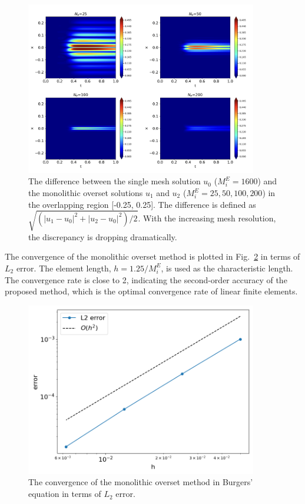 \documentclass[preprint,12pt,sort&compress]{elsarticle}
\theoremstyle{definition}%
\begin{document}
\begin{figure}[!htbp]
	\centering
	\includegraphics[angle=0,width=0.9\textwidth]{fig/burgers-diff.png}
	\caption{The difference between the single mesh solution $u_0$ ($M_i^E=1600$) and the monolithic overset solutions $u_1$ and $u_2$ ($M_i^E=25,50,100,200$) in the overlapping region [-0.25, 0.25]. The difference is defined as $\sqrt{ (|u_1-u_0|^2+|u_2-u_0|^2)/2}$. With the increasing mesh resolution, the discrepancy is dropping dramatically.}
	\label{fig:burgers-diff}
\end{figure}
The convergence of the monolithic overset method is plotted in Fig.~\ref{fig:burgers-convergence} in terms of $L_2$ error. The element length, $h=1.25/M_i^E$,
is used as the characteristic length. The convergence rate is close to 2, indicating the second-order accuracy of the proposed method, which is the optimal convergence rate of linear finite elements.\\
\begin{figure}[!htbp]
  \centering
	\includegraphics[angle=0,width=0.9\textwidth]{fig/burgers-convergence_1.png}
  \caption{The convergence of the monolithic overset method in Burgers' equation in terms of $L_2$ error.}
	\label{fig:burgers-convergence}
\end{figure}
\end{document}
